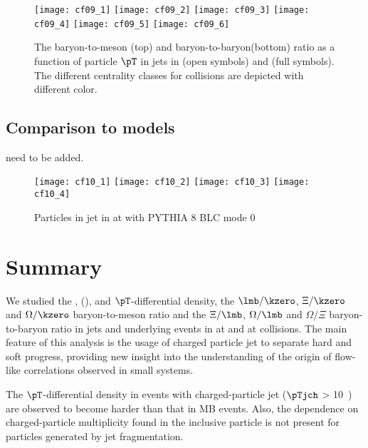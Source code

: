 \documentclass[ALICE,manyauthors]{cernphprep}
\begin{document}
\begin{figure}[!ht]
	\begin{center}
		\texttt{[image: cf09\_1]}
		\texttt{[image: cf09\_2]}
		\texttt{[image: cf09\_3]}
		\texttt{[image: cf09\_4]}
		\texttt{[image: cf09\_5]}
		\texttt{[image: cf09\_6]}
	\end{center}
	\caption{The baryon-to-meson (top) and baryon-to-baryon(bottom) ratio as a function of particle $\pT$ in jets in \pp (open symbols) and \pPb (full symbols). The different centrality classes for \pPb collisions are depicted with different color.}
	\label{fig:pppPbRatio}
\end{figure}

\subsection{Comparison to models}
\label{subsec:ComToMod}

need to be added.

\begin{figure}[!ht]
	\begin{center}
		\texttt{[image: cf10\_1]}
		\texttt{[image: cf10\_2]}
		\texttt{[image: cf10\_3]}
		\texttt{[image: cf10\_4]}

	\end{center}
	\caption{Particles in jet in \pPb at \fivenn with PYTHIA 8 BLC mode 0}
	\label{fig:pPbpyJESpect}
\end{figure}


\clearpage
\section{Summary}%
\label{sec:Summary}

We studied the \kzero, \lmb (\almb), \Xis and \Oms $\pT$-differential density, the $\lmb/\kzero$, $\Xi/\kzero$ and $\Omega/\kzero$ baryon-to-meson ratio and the $\Xi/\lmb$, $\Omega/\lmb$ and $\Omega/\Xi$ baryon-to-baryon ratio in jets and underlying events in \pp at \thirteen and \pPb at \fivenn collisions.
The main feature of this analysis is the usage of charged particle jet to separate hard and soft progress, providing new insight into the understanding of the origin of flow-like correlations observed in small systems.

The $\pT$-differential density in events with charged-particle jet ($\pTjch$ > 10~\GeVc) are observed to become harder than that in MB events.
Also, the dependence on charged-particle multiplicity found in the inclusive particle is not present for particles generated by jet fragmentation.
\end{document}
